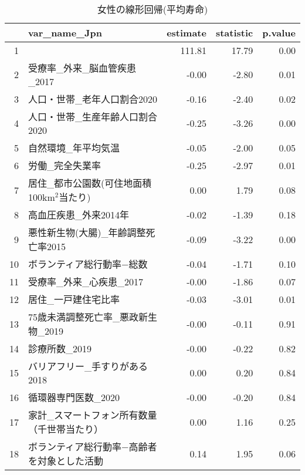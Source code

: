 \begin{table}[ht]
\centering
\caption{女性の線形回帰(平均寿命)}
\label{UsualLMLEf}
\begingroup\tiny

\begin{adjustbox}{width=.5\textwidth}
\begin{tabular}{rlrrr}
  \hline
 & var\_name\_Jpn & estimate & statistic & p.value \\
  \hline
1 &  & 111.81 & 17.79 & 0.00 \\
  2 & 受療率\_外来\_脳血管疾患\_2017 & -0.00 & -2.80 & 0.01 \\
  3 & 人口・世帯\_老年人口割合2020 & -0.16 & -2.40 & 0.02 \\
  4 & 人口・世帯\_生産年齢人口割合2020 & -0.25 & -3.26 & 0.00 \\
  5 & 自然環境\_年平均気温 & -0.05 & -2.00 & 0.05 \\
  6 & 労働\_完全失業率 & -0.25 & -2.97 & 0.01 \\
  7 & 居住\_都市公園数(可住地面積100km$^2$当たり) & 0.00 & 1.79 & 0.08 \\
  8 & 高血圧疾患\_外来2014年 & -0.02 & -1.39 & 0.18 \\
  9 & 悪性新生物(大腸)\_年齢調整死亡率2015 & -0.09 & -3.22 & 0.00 \\
  10 & ボランティア総行動率−総数 & -0.04 & -1.71 & 0.10 \\
  11 & 受療率\_外来\_心疾患\_2017 & -0.00 & -1.86 & 0.07 \\
  12 & 居住\_一戸建住宅比率 & -0.03 & -3.01 & 0.01 \\
  13 & 75歳未満調整死亡率\_悪政新生物\_2019 & -0.00 & -0.11 & 0.91 \\
  14 & 診療所数\_2019 & -0.00 & -0.22 & 0.82 \\
  15 & バリアフリー\_手すりがある2018 & 0.00 & 0.20 & 0.84 \\
  16 & 循環器専門医数\_2020 & -0.00 & -0.20 & 0.84 \\
  17 & 家計\_スマートフォン所有数量（千世帯当たり） & 0.00 & 1.16 & 0.25 \\
  18 & ボランティア総行動率−高齢者を対象とした活動 & 0.14 & 1.95 & 0.06 \\
   \hline
\end{tabular}
\end{adjustbox}

\endgroup
\end{table}
